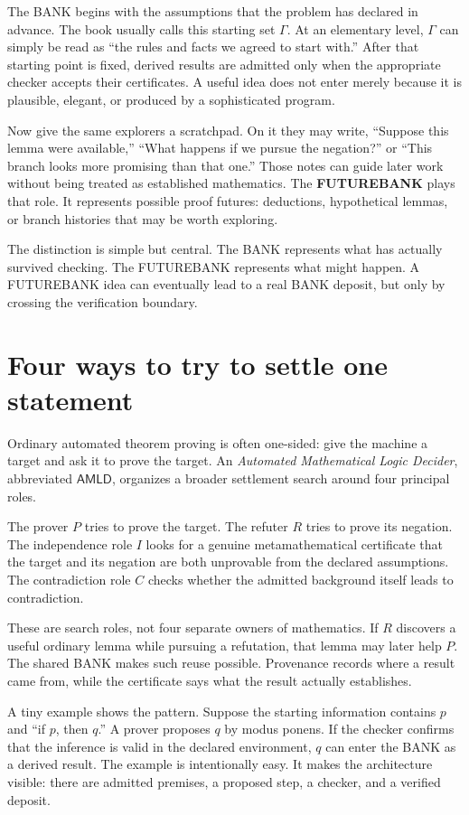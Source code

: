\documentclass[11pt,openany]{book}
\theoremstyle{definition}
\theoremstyle{remark}
\newcommand{\AMLD}{\ensuremath{\mathsf{AMLD}}\xspace}
\begin{document}
The BANK begins with the assumptions that the problem has declared in advance. The book usually calls this starting set $\Gamma$. At an elementary level, $\Gamma$ can simply be read as ``the rules and facts we agreed to start with.'' After that starting point is fixed, derived results are admitted only when the appropriate checker accepts their certificates. A useful idea does not enter merely because it is plausible, elegant, or produced by a sophisticated program.

Now give the same explorers a scratchpad. On it they may write, ``Suppose this lemma were available,'' ``What happens if we pursue the negation?'' or ``This branch looks more promising than that one.'' Those notes can guide later work without being treated as established mathematics. The \textbf{FUTUREBANK} plays that role. It represents possible proof futures: deductions, hypothetical lemmas, or branch histories that may be worth exploring.

The distinction is simple but central. The BANK represents what has actually survived checking. The FUTUREBANK represents what might happen. A FUTUREBANK idea can eventually lead to a real BANK deposit, but only by crossing the verification boundary.

\section*{Four ways to try to settle one statement}
Ordinary automated theorem proving is often one-sided: give the machine a target and ask it to prove the target. An \emph{Automated Mathematical Logic Decider}, abbreviated \AMLD, organizes a broader settlement search around four principal roles.

The prover $P$ tries to prove the target. The refuter $R$ tries to prove its negation. The independence role $I$ looks for a genuine metamathematical certificate that the target and its negation are both unprovable from the declared assumptions. The contradiction role $C$ checks whether the admitted background itself leads to contradiction.

These are search roles, not four separate owners of mathematics. If $R$ discovers a useful ordinary lemma while pursuing a refutation, that lemma may later help $P$. The shared BANK makes such reuse possible. Provenance records where a result came from, while the certificate says what the result actually establishes.

A tiny example shows the pattern. Suppose the starting information contains $p$ and ``if $p$, then $q$.'' A prover proposes $q$ by modus ponens. If the checker confirms that the inference is valid in the declared environment, $q$ can enter the BANK as a derived result. The example is intentionally easy. It makes the architecture visible: there are admitted premises, a proposed step, a checker, and a verified deposit.
\end{document}
